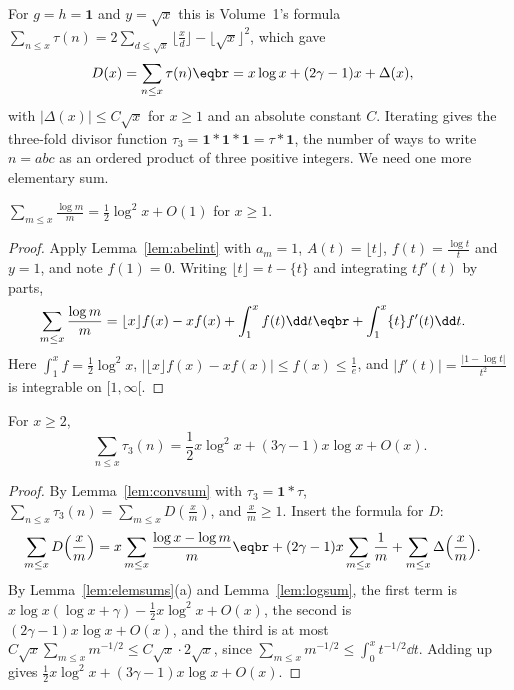 For $g=h=\mathbf1$ and $y=\sqrt x$ this is Volume~1's formula $\sum_{n\le x}\tau(n)=2\sum_{d\le\sqrt x}\lfloor\frac xd\rfloor-\lfloor\sqrt x\rfloor^2$, which gave
\[
\begin{aligned}D(x)&=\sum_{n\le x}\tau(n)\eqbr=x\log x+(2\gamma-1)x+\Delta(x),\end{aligned}
\]
with $|\Delta(x)|\le C\sqrt x$ for $x\ge1$ and an absolute constant $C$. Iterating gives the three-fold divisor function $\tau_3=\mathbf1*\mathbf1*\mathbf1=\tau*\mathbf1$, the number of
ways to write $n=abc$ as an ordered product of three positive integers. We need one more elementary sum.

\begin{lemma}\label{lem:logsum}
$\displaystyle\sum_{m\le x}\frac{\log m}m=\frac12\log^2x+O(1)$ for $x\ge1$.
\end{lemma}
\begin{proof}
Apply Lemma~\ref{lem:abelint} with $a_m=1$, $A(t)=\lfloor t\rfloor$, $f(t)=\frac{\log t}t$ and $y=1$, and note $f(1)=0$. Writing $\lfloor t\rfloor=t-\{t\}$
and integrating $tf'(t)$ by parts,
\[
\begin{aligned}\sum_{m\le x}\frac{\log m}m&=\lfloor x\rfloor f(x)-xf(x)+\int_1^xf(t)\dd t\eqbr+\int_1^x\{t\}f'(t)\dd t.\end{aligned}
\]
Here $\int_1^xf=\frac12\log^2x$, $|\lfloor x\rfloor f(x)-xf(x)|\le f(x)\le\frac1e$, and $|f'(t)|=\frac{|1-\log t|}{t^2}$ is integrable on $[1,\infty[$.
\end{proof}

\begin{theorem}\label{thm:tau3}
For $x\ge2$,
\[
\sum_{n\le x}\tau_3(n)=\frac12x\log^2x+(3\gamma-1)x\log x+O(x).
\]
\end{theorem}
\begin{proof}
By Lemma~\ref{lem:convsum} with $\tau_3=\mathbf1*\tau$, $\sum_{n\le x}\tau_3(n)=\sum_{m\le x}D(\frac xm)$, and $\frac xm\ge1$. Insert the formula for $D$:
\[
\begin{aligned}\sum_{m\le x}D\Bigl(\frac xm\Bigr)&=x\sum_{m\le x}\frac{\log x-\log m}m\eqbr+(2\gamma-1)x\sum_{m\le x}\frac1m+\sum_{m\le x}\Delta\Bigl(\frac xm\Bigr).\end{aligned}
\]
By Lemma~\ref{lem:elemsums}(a) and Lemma~\ref{lem:logsum}, the first term is $x\log x(\log x+\gamma)-\frac12x\log^2x+O(x)$, the second is
$(2\gamma-1)x\log x+O(x)$, and the third is at most $C\sqrt x\sum_{m\le x}m^{-1/2}\le C\sqrt x\cdot2\sqrt x$, since $\sum_{m\le x}m^{-1/2}\le\int_0^xt^{-1/2}\dd t$. Adding up gives
$\frac12x\log^2x+(3\gamma-1)x\log x+O(x)$.
\end{proof}

